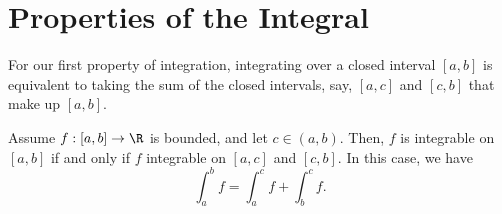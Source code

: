 \section{Properties of the Integral}

For our first property of integration, integrating over a closed interval \( [a,b]  \) is equivalent to taking the sum of the closed intervals, say, \( [a,c]  \) and \( [c,b]  \) that make up \( [a,b]  \).

\begin{theorem}{}{}
	Assume \( f: [a,b] \to \R   \) is bounded, and let \( c \in (a,b)  \). Then, \( f  \) is integrable on \( [a,b]  \) if and only if \( f  \) integrable on \( [a,c]  \) and \( [c,b]  \). In this case, we have 
	\[  \int_{ a }^{ b } f = \int_{ a }^{ c }  f  + \int_{ b }^{ c }  f. \]
\end{theorem}

